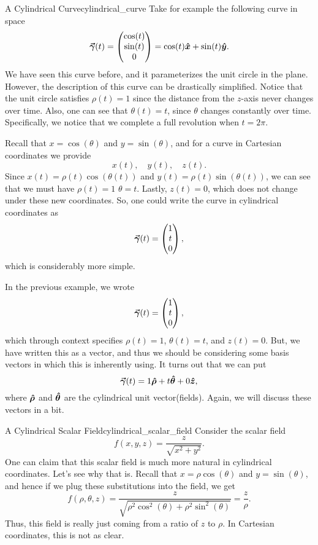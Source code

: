 \begin{ex}{A Cylindrical Curve}{cylindrical_curve}
    Take for example the following curve in space
    \[
    \boldsymbol{\vec{\gamma}}(t) = \begin{pmatrix} \cos(t) \\ \sin(t) \\ 0 \end{pmatrix} = \cos(t)\boldsymbol{\hat{x}} + \sin(t)\boldsymbol{\hat{y}}.
    \]
    We have seen this curve before, and it parameterizes the unit circle in the plane.  However, the description of this curve can be drastically simplified.  Notice that the unit circle satisfies $\rho(t)=1$ since the distance from the $z$-axis never changes over time.  Also, one can see that $\theta(t)=t$, since $\theta$ changes constantly over time.  Specifically, we notice that we complete a full revolution when $t=2\pi$.
    
    Recall that $x=\cos(\theta)$ and $y=\sin(\theta)$, and for a curve in Cartesian coordinates we provide
    \[
    x(t), \quad y(t), \quad z(t).
    \]
    Since $x(t)=\rho(t)\cos(\theta(t))$ and $y(t)=\rho(t)\sin(\theta(t))$, we can see that we must have $\rho(t)=1$ $\theta=t$. Lastly, $z(t)=0$, which does not change under these new coordinates.  So, one could write the curve in cylindrical coordinates as
    \[
    \boldsymbol{\vec{\gamma}}(t) = \begin{pmatrix} 1 \\ t \\ 0 \end{pmatrix},
    \]
    which is considerably more simple.  
\end{ex}

In the previous example, we wrote
\[
\boldsymbol{\vec{\gamma}}(t) = \begin{pmatrix} 1 \\ t \\ 0 \end{pmatrix},
\]
which through context specifies $\rho(t)=1$, $\theta(t)=t$, and $z(t)=0$.  But, we have written this as a vector, and thus we should be considering some basis vectors in which this is inherently using.  It turns out that we can put
\[
\boldsymbol{\vec{\gamma}}(t) = 1\boldsymbol{\hat{\rho}} + t \boldsymbol{\hat{\theta}} + 0\boldsymbol{\hat{z}},
\]
where $\boldsymbol{\hat{\rho}}$ and $\boldsymbol{\hat{\theta}}$ are the cylindrical unit vector(fields).  Again, we will discuss these vectors in a bit.

\begin{ex}{A Cylindrical Scalar Field}{cylindrical_scalar_field}
    Consider the scalar field
    \[
    f(x,y,z) = \frac{z}{\sqrt{x^2+y^2}}.
    \]
    One can claim that this scalar field is much more natural in cylindrical coordinates.  Let's see why that is.  Recall that $x=\rho\cos(\theta)$ and $y=\sin(\theta)$, and hence if we plug these substitutions into the field, we get
    \[
    f(\rho,\theta,z) = \frac{z}{\sqrt{\rho^2 \cos^2(\theta) + \rho^2 \sin^2(\theta)}} = \frac{z}{\rho}.
    \]
    Thus, this field is really just coming from a ratio of $z$ to $\rho$.  In Cartesian coordinates, this is not as clear.
\end{ex}

